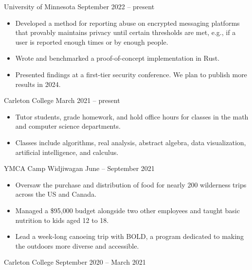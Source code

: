 \documentclass{ali-resume}
\begin{document}
{University of Minnesota}
{September 2022 -- present}

\begin{itemize}
	\item Developed a method for reporting abuse on encrypted messaging platforms that provably maintains privacy until certain thresholds are met, e.g., if a user is reported enough times or by enough people.
	\item Wrote and benchmarked a proof-of-concept implementation in Rust.
	\item Presented findings at a first-tier security conference. We plan to publish more results in 2024.
\end{itemize}

{Carleton College}
{March 2021 -- present}

\begin{itemize}
	\item Tutor students, grade homework, and hold office hours for classes in the math and computer science departments.
	\item Classes include
	      algorithms, %
	      real analysis, %
	      abstract algebra, %
	      data visualization, %
	      artificial intelligence, %
	      and calculus. %
\end{itemize}

{YMCA Camp Widjiwagan}
{June -- September 2021}

\begin{itemize}
	\item Oversaw the purchase and distribution of food for nearly 200 wilderness trips across the US and Canada.
	\item Managed a \$95,000 budget alongside two other employees and taught basic nutrition to kids aged 12 to 18.
	\item Lead a week-long canoeing trip with BOLD, a program dedicated to making the outdoors more diverse and accessible.
\end{itemize}

{Carleton College}
{September 2020 -- March 2021}


\end{document}
